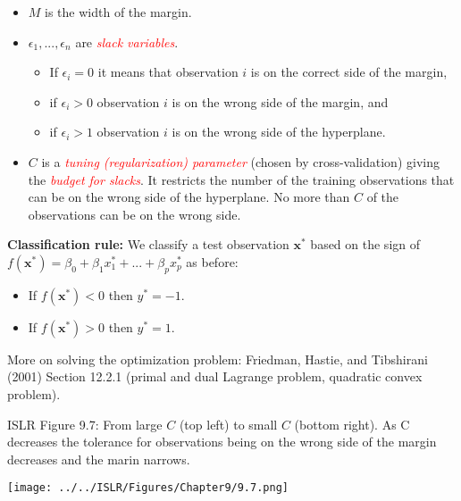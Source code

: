 \documentclass[10pt,ignorenonframetext,]{beamer}
\providecommand{\tightlist}{%
  \setlength{\itemsep}{0pt}\setlength{\parskip}{0pt}}
\begin{document}
\begin{frame}

\begin{itemize}
\item
  \(M\) is the width of the margin.
\item
  \(\epsilon_1,...,\epsilon_n\) are
  \emph{\textcolor{red}{slack variables}}.

  \begin{itemize}
  \tightlist
  \item
    If \(\epsilon_i=0\) it means that observation \(i\) is on the
    correct side of the margin,
  \item
    if \(\epsilon_i>0\) observation \(i\) is on the wrong side of the
    margin, and
  \item
    if \(\epsilon_i>1\) observation \(i\) is on the wrong side of the
    hyperplane.
  \end{itemize}
\item
  \(C\) is a \emph{\textcolor{red}{tuning (regularization) parameter}}
  (chosen by cross-validation) giving the
  \emph{\textcolor{red}{budget for slacks}}. It restricts the number of
  the training observations that can be on the wrong side of the
  hyperplane. No more than \(C\) of the observations can be on the wrong
  side.
\end{itemize}

\end{frame}

\begin{frame}

\textbf{Classification rule:} We classify a test observation
\({\boldsymbol x}^*\) based on the sign of
\(f({\boldsymbol x}^*)=\beta_0+\beta_1 x_1^*+...+\beta_p x_p^*\) as
before:

\begin{itemize}
\tightlist
\item
  If \(f({\boldsymbol x}^*)<0\) then \(y^*=-1\).
\item
  If \(f({\boldsymbol x}^*)>0\) then \(y^*=1\).
\end{itemize}

More on solving the optimization problem: Friedman, Hastie, and
Tibshirani (2001) Section 12.2.1 (primal and dual Lagrange problem,
quadratic convex problem).

\end{frame}

\begin{frame}

ISLR Figure 9.7: From large \(C\) (top left) to small \(C\) (bottom
right). As C decreases the tolerance for observations being on the wrong
side of the margin decreases and the marin narrows.

\centering
\texttt{[image: ../../ISLR/Figures/Chapter9/9.7.png]}

\end{frame}
\end{document}
